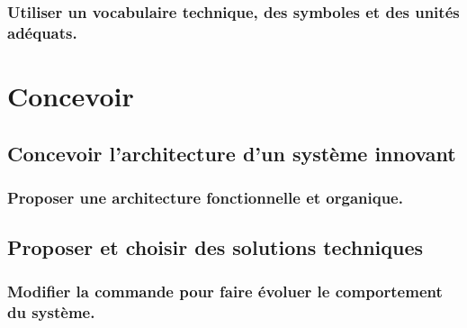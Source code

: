 \documentclass[10pt,fleqn]{book}
\begin{document}
\subsection{Utiliser un vocabulaire technique, des symboles et des unités adéquats.} 

\begin{multicols}{2} 

\end{multicols}

\chapter{Concevoir} 

\section{Concevoir l'architecture d'un système innovant} 

\subsection{Proposer une architecture fonctionnelle et organique.} 

\begin{multicols}{2} 

\end{multicols}

\section{Proposer et choisir des solutions techniques} 

\subsection{Modifier la commande pour faire évoluer le comportement du système. } 

\begin{multicols}{2} 

\end{multicols}
\end{document}
